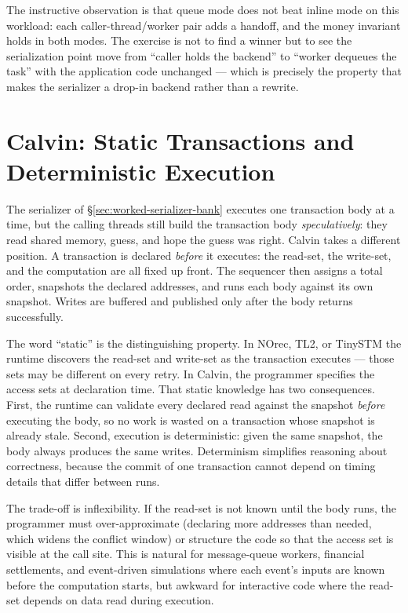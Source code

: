 The instructive observation is that queue mode does not beat inline mode on
this workload: each caller-thread/worker pair adds a handoff, and the money
invariant holds in both modes. The exercise is not to find a winner but to see
the serialization point move from ``caller holds the backend'' to ``worker
dequeues the task'' with the application code unchanged --- which is precisely
the property that makes the serializer a drop-in backend rather than a
rewrite.

\section{Calvin: Static Transactions and Deterministic Execution}
\label{sec:calvin-static}

The serializer of \S\ref{sec:worked-serializer-bank} executes one transaction body at a time, but the calling threads still build the transaction body \emph{speculatively}: they read shared memory, guess, and hope the guess was right. Calvin takes a different position. A transaction is declared \emph{before} it executes: the read-set, the write-set, and the computation are all fixed up front. The sequencer then assigns a total order, snapshots the declared addresses, and runs each body against its own snapshot. Writes are buffered and published only after the body returns successfully.

The word ``static'' is the distinguishing property. In NOrec, TL2, or TinySTM the runtime discovers the read-set and write-set as the transaction executes --- those sets may be different on every retry. In Calvin, the programmer specifies the access sets at declaration time. That static knowledge has two consequences. First, the runtime can validate every declared read against the snapshot \emph{before} executing the body, so no work is wasted on a transaction whose snapshot is already stale. Second, execution is deterministic: given the same snapshot, the body always produces the same writes. Determinism simplifies reasoning about correctness, because the commit of one transaction cannot depend on timing details that differ between runs.

The trade-off is inflexibility. If the read-set is not known until the body runs, the programmer must over-approximate (declaring more addresses than needed, which widens the conflict window) or structure the code so that the access set is visible at the call site. This is natural for message-queue workers, financial settlements, and event-driven simulations where each event's inputs are known before the computation starts, but awkward for interactive code where the read-set depends on data read during execution.

